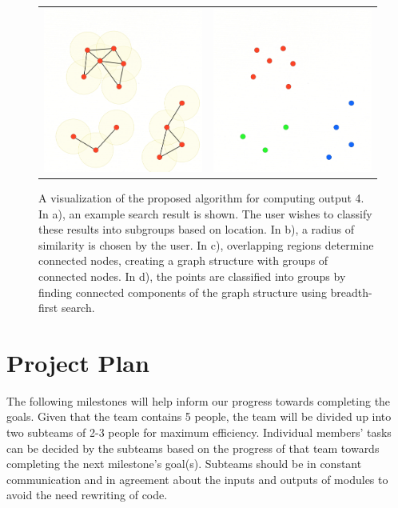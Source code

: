 \documentclass{article}
\begin{document}
\begin{figure}[p]
\begin{tabular}{ p{79mm}p{79mm} }
\includegraphics[width=78mm,frame=0.01cm]{Large/Fig3.png} & \includegraphics[width=78mm,frame=0.01cm]{Large/Fig4.png}
\end{tabular}
\caption{A visualization of the proposed algorithm for computing output 4. In a), an example search result is shown. The user wishes to classify these results into subgroups based on location. In b), a radius of similarity is chosen by the user. In c), overlapping regions determine connected nodes, creating a graph structure with groups of connected nodes. In d), the points are classified into groups by finding connected components of the graph structure using breadth-first search.}
\label{fig:Groupings}
\end{figure}

\clearpage
\section{Project Plan}
The following milestones will help inform our progress towards completing the goals. Given that the team contains 5 people, the team will be divided up into two subteams of 2-3 people for maximum efficiency. Individual members' tasks can be decided by the subteams based on the progress of that team towards completing the next milestone's goal(s). Subteams should be in constant communication and in agreement about the inputs and outputs of modules to avoid the need rewriting of code.
\end{document}
